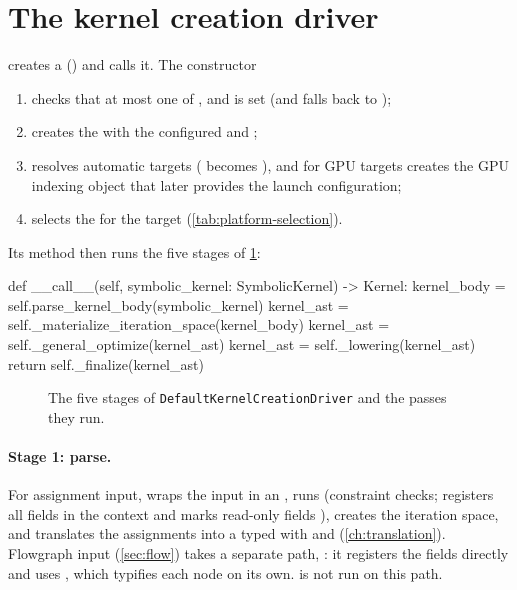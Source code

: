 \section{The kernel creation driver}\label{sec:driver}

 creates a 
() and calls it. The constructor
\begin{enumerate}
  \item checks that at most one of ,  and
         is set (and falls back to );
  \item creates the  with the configured 
        and ;
  \item resolves automatic targets ( becomes ), and for
        GPU targets creates the GPU indexing object that later provides the launch
        configuration;
  \item selects the  for the target (\cref{tab:platform-selection}).
\end{enumerate}
Its  method then runs the five stages of \cref{fig:pipeline}:
\begin{pycode}
def __call__(self, symbolic_kernel: SymbolicKernel) -> Kernel:
    kernel_body = self.parse_kernel_body(symbolic_kernel)
    kernel_ast = self._materialize_iteration_space(kernel_body)
    kernel_ast = self._general_optimize(kernel_ast)
    kernel_ast = self._lowering(kernel_ast)
    return self._finalize(kernel_ast)
\end{pycode}

\begin{figure}[htbp]
  \centering
  
  \caption[The five stages of the kernel creation driver]{The five stages of \texttt{DefaultKernelCreationDriver} and the passes they run.}
  \label{fig:pipeline}
\end{figure}

\paragraph{Stage 1: parse.}
For assignment input,  wraps the input in an
, runs  (constraint checks; registers all
fields in the context and marks read-only fields ), creates the iteration
space, and translates the assignments into a typed  with
 and  (\cref{ch:translation}). Flowgraph input
(\cref{sec:flow}) takes a separate path, : it registers the fields
directly and uses , which typifies each node on its own.
 is not run on this path.

